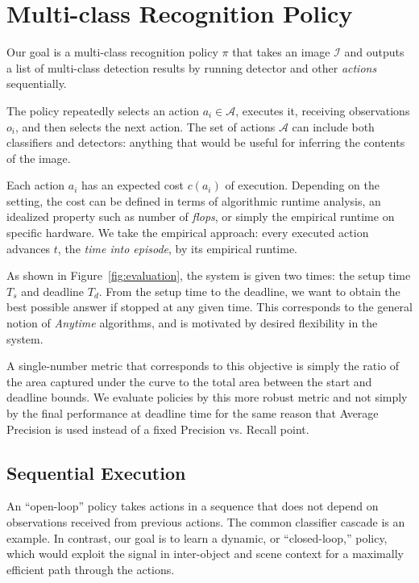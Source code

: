 \section{Multi-class Recognition Policy} \label{sec:tech}
Our goal is a multi-class recognition policy $\pi$ that takes an image $\mathcal{I}$ and outputs a list of multi-class detection results by running detector and other \emph{actions} sequentially.

The policy repeatedly selects an action $a_i \in \mathcal{A}$, executes it, receiving observations $o_i$, and then selects the next action.
The set of actions $\mathcal{A}$ can include both classifiers and detectors: anything that would be useful for inferring the contents of the image.

Each action $a_i$ has an expected cost $c(a_i)$ of execution.
Depending on the setting, the cost can be defined in terms of algorithmic runtime analysis, an idealized property such as number of \emph{flops}, or simply the empirical runtime on specific hardware.
We take the empirical approach: every executed action advances $t$, the \emph{time into episode}, by its empirical runtime.

As shown in Figure~\ref{fig:evaluation}, the system is given two times: the setup time $T_s$ and deadline $T_d$.
From the setup time to the deadline, we want to obtain the best possible answer if stopped at any given time.
This corresponds to the general notion of \emph{Anytime} algorithms, and is motivated by desired flexibility in the system.

A single-number metric that corresponds to this objective is simply the ratio of the area captured under the curve to the total area between the start and deadline bounds.
We evaluate policies by this more robust metric and not simply by the final performance at deadline time for the same reason that Average Precision is used instead of a fixed Precision vs. Recall point.

\subsection{Sequential Execution}
An ``open-loop'' policy takes actions in a sequence that does not depend on observations received from previous actions.
The common classifier cascade \cite{Viola2001} is an example.
In contrast, our goal is to learn a dynamic, or ``closed-loop,'' policy, which would exploit the signal in inter-object and scene context for a maximally efficient path through the actions.

